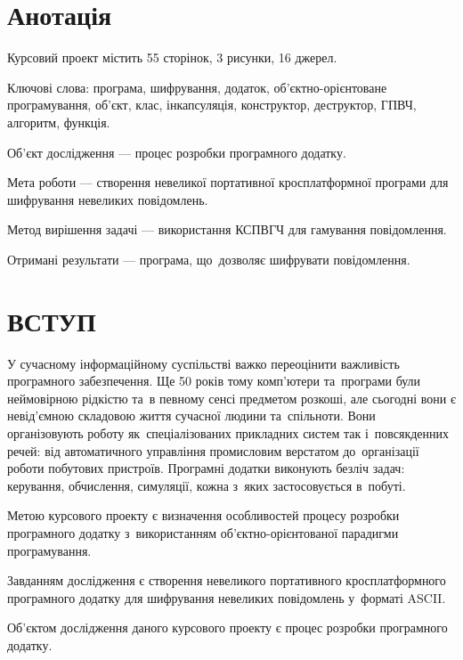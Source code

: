 \documentclass[a4paper,oneside,titlepage,14pt]{extarticle}
\begin{document}
	\section*{\centering Анотація}
		Курсовий проект містить 55 сторінок, 3 рисунки, 16 джерел.\par
		Ключові слова: програма, шифрування, додаток, об'\-єкт\-но-орі\-єн\-то\-ва\-не програмування, об'єкт, клас, інкапсуляція, конструктор, деструктор, ГПВЧ, алгоритм, функція.\par
		Об'єкт дослідження --- процес розробки програмного додатку.\par
		Мета роботи --- створення невеликої портативної кросплатформної програми для шифрування невеликих повідомлень.\par
		Метод вирішення задачі --- використання КСПВГЧ для гамування повідомлення.\par
		Отримані результати --- програма, що~дозволяє шифрувати повідомлення.\par
	
	\newpage
	
	\section*{\centering ВСТУП}
		У сучасному інформаційному суспільстві важко переоцінити важливість програмного забезпечення. Ще 50 років тому ком\-п'ю\-те\-ри та~програми були неймовірною рідкістю та~в певному сенсі предметом розкоші, але сьогодні вони є невід'ємною складовою життя сучасної людини та~спільноти. Вони організовують роботу як~спеціалізованих прикладних систем так і~повсякденних речей: від автоматичного управління промисловим верстатом до~організації роботи побутових пристроїв. Програмні додатки виконують безліч задач: керування, обчислення, симуляції, кожна з~яких застосовується в~побуті.\par
		
		Метою курсового проекту є визначення особливостей процесу розробки програмного додатку з~використанням об'єктно-орієнтованої парадигми програмування.\par
		
		Завданням дослідження є створення невеликого портативного кросплатформного програмного додатку для шифрування невеликих повідомлень у~форматі ASCII.\par
		
		Об'єктом дослідження даного курсового проекту є процес розробки програмного додатку.\par
		
\end{document}
